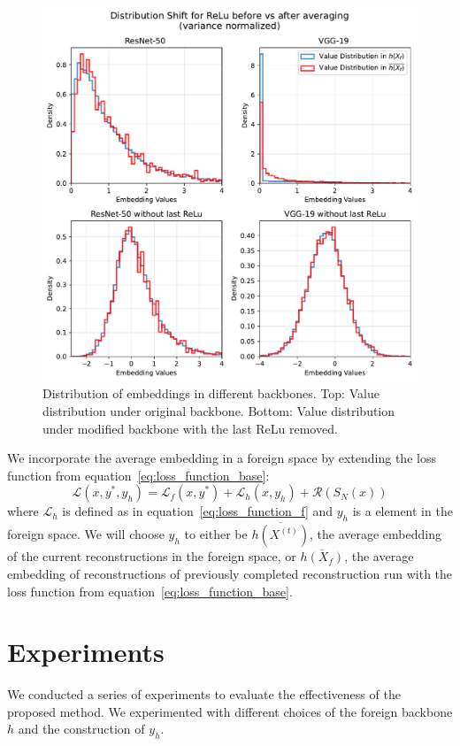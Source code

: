 \documentclass[10pt,twocolumn]{article}
\begin{document}
\begin{figure}[ht]
    \centering
    \includegraphics[width=\linewidth]{figures/relu-norelu-distribution-shift}
    \caption{
       Distribution of embeddings in different backbones.
       Top: Value distribution under original backbone.
       Bottom: Value distribution under modified backbone with the last ReLu removed.
    }
    \label{fig:relu_norelu_distribution_shift}
\end{figure}

We incorporate the average embedding in a foreign space by extending the loss function from equation~\ref{eq:loss_function_base}:
\begin{equation}\label{eq:loss_function}
\mathcal{L}(x, y^*, y_h) = \mathcal{L}_{f}(x, y^*) + \mathcal{L}_{h}(x, y_h) + \mathcal{R}(S_N(x))
\end{equation}
where $\mathcal{L}_{h}$ is defined as in equation~\ref{eq:loss_function_f} and $y_h$ is a element in the foreign space.
We will choose $y_h$ to either be $\overline{h(X^{(t)})}$, the average embedding of the current reconstructions in the foreign space, or $\overline{h(X_f)}$, the average embedding of reconstructions of previously completed reconstruction run with the loss function from equation~\ref{eq:loss_function_base}.

\section{Experiments}
We conducted a series of experiments to evaluate the effectiveness of the proposed method.
We experimented with different choices of the foreign backbone $h$ and the construction of $y_h$.
\end{document}
